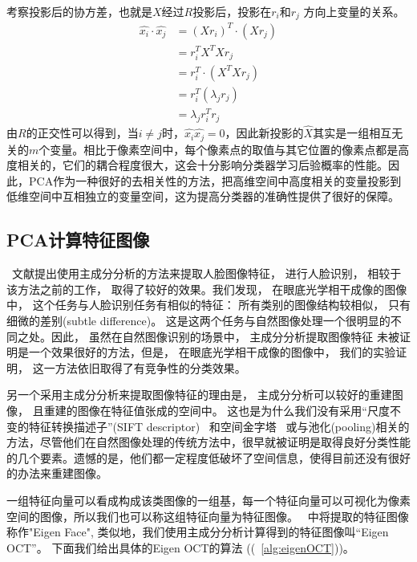     考察投影后的协方差，也就是$X$经过$R$投影后，投影在$r_i$和$r_j$ 方向上变量的关系。
    \begin{equation}
    \begin{split}
        \hat{x_i} \cdot \hat{x_j} & = (Xr_i)^T \cdot (Xr_j) \\
        & = r_i^T X^T X r_j \\
        & = r_i^T\cdot(X^T X r_j) \\
        & = r_i^T(\lambda_j r_j) \\
        & = \lambda_j r_i^T r_j 
    \end{split}
    \end{equation}
    由$R$的正交性可以得到，当$i \ne j$时，$\hat{x_i} \hat{x_j} = 0$，因此新投影的$\hat{X}$其实是一组相互无关的$m$个变量。相比于像素空间中，每个像素点的取值与其它位置的像素点都是高度相关的，它们的耦合程度很大，这会十分影响分类器学习后验概率的性能。因此，PCA作为一种很好的去相关性的方法，把高维空间中高度相关的变量投影到低维空间中互相独立的变量空间，这为提高分类器的准确性提供了很好的保障。 
 
    
    \subsection{PCA计算特征图像}
        ~文献提出使用主成分分析的方法来提取人脸图像特征， 进行人脸识别， 相较于该方法之前的工作， 取得了较好的效果。我们发现， 在眼底光学相干成像的图像中， 这个任务与人脸识别任务有相似的特征： 所有类别的图像结构较相似， 只有细微的差别(subtle difference)。 这是这两个任务与自然图像处理一个很明显的不同之处。因此， 虽然在自然图像识别的场景中， 主成分分析提取图像特征 未被证明是一个效果很好的方法，但是， 在眼底光学相干成像的图像中， 我们的实验证明， 这一方法依旧取得了有竞争性的分类效果。 

        另一个采用主成分分析来提取图像特征的理由是， 主成分分析可以较好的重建图像， 且重建的图像在特征值张成的空间中。  这也是为什么我们没有采用“尺度不变的特征转换描述子”(SIFT descriptor) ~\cite{yang2009linear}和空间金字塔~\cite{lazebnik2006beyond} 或与池化(pooling)相关的方法，尽管他们在自然图像处理的传统方法中，很早就被证明是取得良好分类性能的几个要素。遗憾的是，他们都一定程度低破坏了空间信息，使得目前还没有很好的办法来重建图像。

        一组特征向量可以看成构成该类图像的一组基，每一个特征向量可以可视化为像素空间的图像，所以我们也可以称这组特征向量为特征图像。~\cite{turk1991eigenfaces} 中将提取的特征图像称作"Eigen Face", 类似地，我们使用主成分分析计算得到的特征图像叫“Eigen OCT”。 下面我们给出具体的Eigen OCT的算法 ((~\ref{alg:eigenOCT}))。

